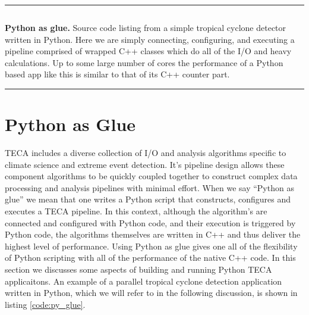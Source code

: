 \documentclass[a4paper,10pt,DIV=12]{scrreprt}
\begin{document}
\begin{listing}[p]
\begin{center}
\hrule\vspace{1mm}
\begin{minipage}{0.8\textwidth}
\inputminted[fontsize=\footnotesize, linenos]{python}{source/python_as_glue.py}
\caption{{\bf Python as glue.} Source code listing from a simple tropical cyclone detector written in Python. Here we are simply connecting, configuring, and executing a pipeline comprised of wrapped C++ classes which do all of the I/O and heavy calculations. Up to some large number of cores the performance of a Python based app like this is similar to that of its C++ counter part. }
\label{code:py_glue}
\end{minipage}
\hrule
\end{center}
\end{listing}
\section{Python as Glue}
\label{sec:py_glue}
TECA includes a diverse collection of I/O and analysis algorithms specific to climate science and extreme event detection. It's pipeline design allows these component algorithms to be quickly coupled together to construct complex data processing and analysis pipelines with minimal effort. When we say ``Python as glue'' we mean that one writes a Python script that constructs, configures and executes a TECA pipeline. In this context, although the algorithm's are connected and configured with Python code, and their execution is triggered by Python code, the algorithms themselves are written in C++ and thus deliver the highest level of performance. Using Python as glue gives one all of the flexibility of Python scripting with all of the performance of the native C++ code. In this section we discusses some aspects of building and running Python TECA applicaitons. An example of a parallel tropical cyclone detection application written in Python, which we will refer to in the following discussion, is shown in listing \ref{code:py_glue}. 
\end{document}
